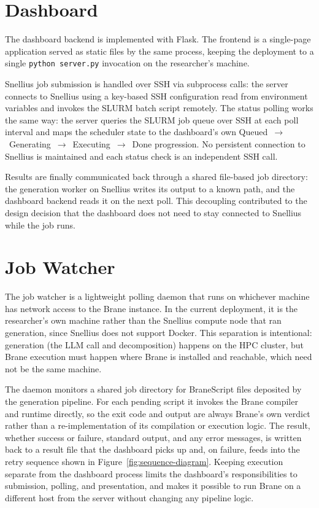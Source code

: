 \section{Dashboard}\label{s:frontend}

The dashboard backend is implemented with Flask. The frontend is a
single-page application served as static files by the same process, keeping
the deployment to a single \texttt{python server.py} invocation on the
researcher's machine.

Snellius job submission is handled over SSH via subprocess calls: the server
connects to Snellius using a key-based SSH configuration read from environment
variables and invokes the SLURM batch script remotely. The status polling works
the same way: the server queries the SLURM job queue over SSH at each poll
interval and maps the scheduler state to the dashboard's own
Queued~$\rightarrow$~Generating~$\rightarrow$~Executing~$\rightarrow$~Done
progression. No persistent connection to Snellius is maintained and each status
check is an independent SSH call.

Results are finally communicated back through a shared file-based job directory: the
generation worker on Snellius writes its output to a known path, and the
dashboard backend reads it on the next poll. This decoupling contributed to the design decision that the
dashboard does not need to stay connected to Snellius while the job runs.

\section{Job Watcher}\label{s:job-watcher}

The job watcher is a lightweight polling daemon that runs on whichever
machine has network access to the Brane instance. In the current
deployment, it is the researcher's own machine rather than the Snellius compute
node that ran generation, since Snellius does not support Docker. 
This separation is intentional: generation (the
LLM call and decomposition) happens on the HPC cluster, but Brane execution
must happen where Brane is installed and reachable, which need not be the
same machine.

The daemon monitors a shared job directory for BraneScript files deposited
by the generation pipeline. For each pending script it invokes the Brane
compiler and runtime directly, so the exit code and output are always Brane's
own verdict rather than a re-implementation of its compilation or execution
logic. The result, whether success or failure, standard output, and any error
messages, is written back to a result file that the dashboard picks up and,
on failure, feeds into the retry sequence shown in
Figure~\ref{fig:sequence-diagram}. Keeping execution separate from the
dashboard process limits the dashboard's responsibilities to submission,
polling, and presentation, and makes it possible to run Brane on a different
host from the server without changing any pipeline logic.

